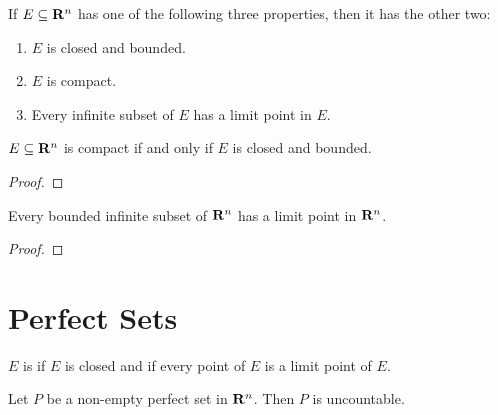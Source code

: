 \begin{proposition}
If $E\subseteq\mathbf R^n$ has one of the following three properties, then it has the other two:
\begin{enumerate}[label=(\roman*)]
\item $E$ is closed and bounded.
\item $E$ is compact.
\item Every infinite subset of $E$ has a limit point in $E$.
\end{enumerate}
\end{proposition}

\begin{theorem}
$E\subseteq\mathbf R^n$ is compact if and only if $E$ is closed and bounded.
\end{theorem}

\begin{proof}

\end{proof}

\begin{theorem}
Every bounded infinite subset of $\mathbf R^n$ has a limit point in $\mathbf R^n$.
\end{theorem}

\begin{proof}

\end{proof}

\begin{comment}
sequential compactness
A set $K$ is compact if and only if every sequence of points in $K$ has a subsequence that converges to a point in $K$.

Any continuous function defined on a compact set is bounded.

extreme value theorem
\end{comment}
\pagebreak

\section{Perfect Sets}
\begin{definition}
$E$ is  if $E$ is closed and if every point of $E$ is a limit point of $E$.
\end{definition}

\begin{proposition}
Let $P$ be a non-empty perfect set in $\mathbf R^n$. Then $P$ is uncountable.
\end{proposition}


